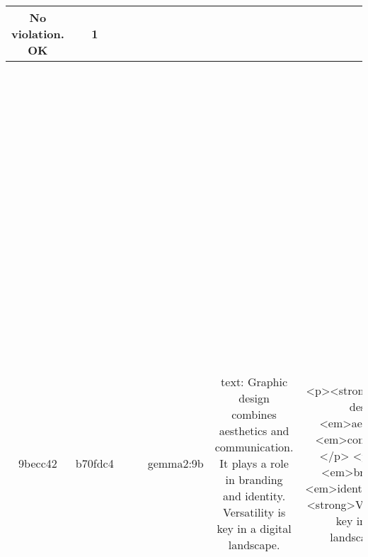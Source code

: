 \begin{table}[h!]
\begin{tabular}{|c|c|c|c|c|c|c|c|c|c|}
No violation.
OK & 1\\
\hline
9becc42 & b70fdc4 &  &  & gemma2:9b & text: Graphic design combines aesthetics and communication. It plays a role in branding and identity. Versatility is key in a digital landscape. & <p><strong>Graphic</strong> design combines <em>aesthetics</em> and <em>communication</em>.</p>
<p>It plays a role in <em>branding</em> and <em>identity</em>.</p>
<p><strong>Versatility</strong> is key in a <em>digital landscape</em>.</p> 
 & ok & The chatbot's output contains three <p> tags, which meets the requirement of having at least three paragraph tags. Inside each <p> tag, there is one <strong> tag, fulfilling the requirement of incorporating a strong tag in each paragraph. Additionally, each <p> tag contains multiple <em> tags (at least two), which aligns with the guideline to emphasize key words and phrases using the emphasize tag. Therefore, the output complies with the description provided.

No violation.
OK & 1\\
\hline
5c14140 & b70fdc4 &  &  & gemma2:9b & text: Agriculture sustains human populations. Technological advancements increase yields. Sustainable practices protect soil health. & <p><strong>Agriculture</strong> sustains <em>human</em> **populations**. </p>
<p><strong>Technological</strong> **advancements** *increase* **yields**. </p>
<p><strong>Sustainable</strong> practices *protect* **soil** *health*. </p>  


Let me know if you'd like me to modify the emphasis or add any other HTML elements! & err & The evaluation of the chatbot output is based on compliance with the given description. Here's my reasoning:

1. **Number of `<p>` Tags**: The output contains three `<p>` tags, which is compliant with the requirement for the answer to have at least three `<p>` tags.

2. **Use of `<strong>` Tag**: Each `<p>` tag in the output contains a `<strong>` tag, as required by the description.

3. **Use of `<em>` Tags**: The description requires multiple `<em>` tags to emphasize key words and phrases within each `<p>` tag. However, the output does not contain any `<em>` tags.

4. **Use of Improper Emphasis Tags**: The output incorrectly contains other forms of emphasis like `**` and `*`, which are not valid HTML tags and do not comply with the instructions to use `<em>` tags for emphasis.


\end{tabular}
\end{table}

